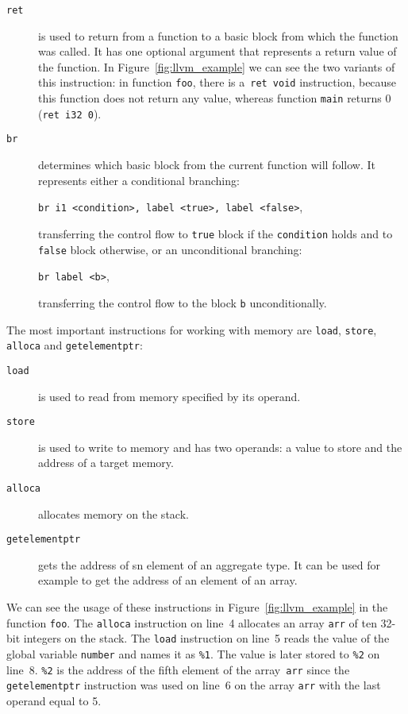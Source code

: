 \begin{description}
\item[\texttt{ret}] is used to return from a function to a basic block from
which the function was called. It has one optional argument that represents a
return value of the function. In Figure~\ref{fig:llvm_example} we can see the
two variants of this instruction: in function \texttt{foo}, there is
a~\texttt{ret void} instruction, because this function does not return any
value, whereas function \texttt{main} returns 0 (\texttt{ret i32 0}).

\item[\texttt{br}] determines which basic block from the current function
will follow. It represents either a conditional branching:

\texttt{br i1 <condition>, label <true>, label <false>},

transferring the control flow to \texttt{true} block if the \texttt{condition} holds and to
\texttt{false} block otherwise, or an unconditional branching:

\texttt{br label <b>},

transferring the control flow to the block \texttt{b} unconditionally.
\end{description}

The most important instructions for working with memory are \texttt{load},
\texttt{store}, \texttt{alloca} and \texttt{getelementptr}:
\begin{description}
\item[\texttt{load}] is used to read from memory specified by its operand.
\item[\texttt{store}] is used to write to memory and has two operands: a value
to store and the address of a target memory.
\item[\texttt{alloca}] allocates memory on the stack.
\item[\texttt{getelementptr}] gets the address of sn element of an aggregate type.
It can be used for example to get the address of an element of an array.
\end{description}
We can see the usage of these instructions in Figure~\ref{fig:llvm_example} in
the function \texttt{foo}. The \texttt{alloca} instruction on line~4 allocates an
array \texttt{arr} of ten 32-bit integers on the stack. The \texttt{load}
instruction on line~5 reads the value of the global variable \texttt{number} and
names it as \texttt{\%1}. The value is later stored to \texttt{\%2} on line~8.
\texttt{\%2} is the address of the fifth element of the array~\texttt{arr} since the
\texttt{getelementptr} instruction was used on line~6 on the array \texttt{arr}
with the last operand equal to 5.

